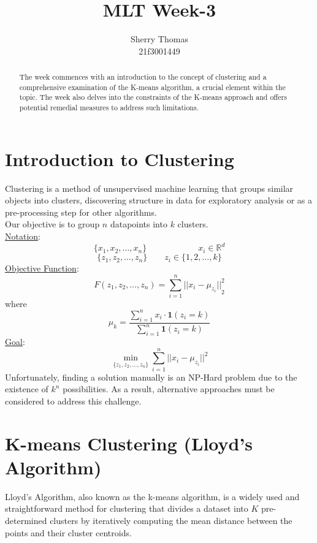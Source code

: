 \documentclass[letterpaper,11pt]{article}
\title{MLT Week-3}
\author{Sherry Thomas \\ 21f3001449}
\begin{document}
\maketitle
\tableofcontents

\begin{abstract}
The week commences with an introduction to the concept of clustering and a comprehensive examination of the K-means algorithm, a crucial element within the topic. The week also delves into the constraints of the K-means approach and offers potential remedial measures to address such limitations.
\end{abstract}

\newpage

\section{Introduction to Clustering}
Clustering is a method of unsupervised machine learning that groups similar objects into clusters, discovering structure in data for exploratory analysis or as a pre-processing step for other algorithms. \\
Our objective is to group $n$ datapoints into $k$ clusters. \\
\underline{Notation}:
$$
\{x_1, x_2, \dots, x_n \} \hspace{6em} x_i \in \mathbb{R}^d 
$$
$$
\{z_1, z_2, \dots, z_n\} \hspace{2em} z_i \in \{1, 2, \dots, k\}
$$
\underline{Objective Function}:
$$
F(z_1, z_2, \dots, z_n) = \sum _{i=1} ^{n} {|| x_i - \mu _{z_i} ||}_2 ^2
$$
where
$$
\mu _k = \frac{\displaystyle \sum _{i = 1} ^{n} {x_i \cdot \mathbf{1}(z_i=k)}}{\displaystyle \sum _{i = 1} ^{n} {\mathbf{1}(z_i=k)}}
$$
\underline{Goal}:
$$
\min _{\{z_1, z_2, \ldots, z_n\}} \sum _{i=1} ^{n} {|| x_i - \mu _{z_i} ||}^2
$$
Unfortunately, finding a solution manually is an NP-Hard problem due to the existence of $k^n$ possibilities. As a result, alternative approaches must be considered to address this challenge.


\section{K-means Clustering (Lloyd's Algorithm)}
Lloyd's Algorithm, also known as the k-means algorithm, is a widely used and straightforward method for clustering that divides a dataset into $K$ pre-determined clusters by iteratively computing the mean distance between the points and their cluster centroids.
\end{document}
